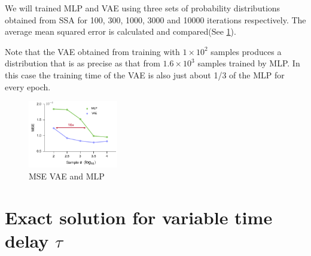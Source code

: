 \documentclass[a4paper,10pt]{article}
\begin{document}
We will trained MLP and VAE using three sets of probability distributions obtained from SSA for 100, 300, 1000, 3000 and 10000 iterations respectively. The average mean squared error is calculated and compared(See \ref{MSE_VAE_MLP}).

Note that the VAE obtained from training with $1 \times 10^2$ samples produces a distribution that is as precise as that from $1.6 \times 10^3$ samples trained by MLP. In this case the training time of the VAE is also just about 1/3 of the MLP for every epoch.
\begin{figure}[h]
	\centering
	\includegraphics[width=0.35\textwidth]{Figs/MSE_VAE_MLP.pdf}
	\caption{MSE VAE and MLP}\label{MSE_VAE_MLP}  
\end{figure}
\section{Exact solution for variable time delay $\tau$}



\end{document}
